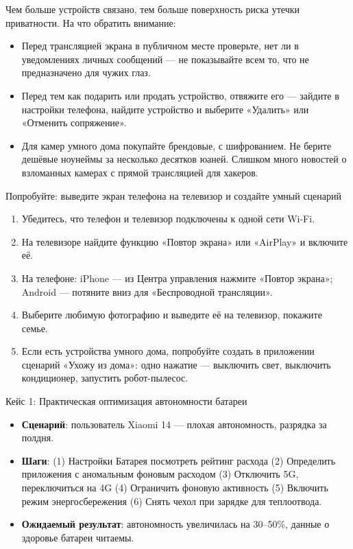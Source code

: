 
Чем больше устройств связано, тем больше поверхность риска утечки приватности. На что обратить внимание:

\begin{itemize}
  \item Перед трансляцией экрана в публичном месте проверьте, нет ли в уведомлениях личных сообщений — не показывайте всем то, что не предназначено для чужих глаз.
  \item Перед тем как подарить или продать устройство, отвяжите его — зайдите в настройки телефона, найдите устройство и выберите «Удалить» или «Отменить сопряжение».
  \item Для камер умного дома покупайте брендовые, с шифрованием. Не берите дешёвые ноунеймы за несколько десятков юаней. Слишком много новостей о взломанных камерах с прямой трансляцией для хакеров.
\end{itemize}

\begin{tcbpractice}{Попробуйте: выведите экран телефона на телевизор и создайте умный сценарий}
\begin{enumerate}
  \item Убедитесь, что телефон и телевизор подключены к одной сети Wi-Fi.
  \item На телевизоре найдите функцию «Повтор экрана» или «AirPlay» и включите её.
  \item На телефоне: iPhone — из Центра управления нажмите «Повтор экрана»; Android — потяните вниз для «Беспроводной трансляции».
  \item Выберите любимую фотографию и выведите её на телевизор, покажите семье.
  \item Если есть устройства умного дома, попробуйте создать в приложении сценарий «Ухожу из дома»: одно нажатие — выключить свет, выключить кондиционер, запустить робот-пылесос.
\end{enumerate}

\end{tcbpractice}

\begin{tcbinfo}{Кейс 1: Практическая оптимизация автономности батареи}
\begin{itemize}
  \item \textbf{Сценарий}: пользователь Xiaomi 14 — плохая автономность, разрядка за полдня.
  \item \textbf{Шаги}: (1) Настройки Батарея посмотреть рейтинг расхода (2) Определить приложения с аномальным фоновым расходом (3) Отключить 5G, переключиться на 4G (4) Ограничить фоновую активность (5) Включить режим энергосбережения (6) Снять чехол при зарядке для теплоотвода.
  \item \textbf{Ожидаемый результат}: автономность увеличилась на 30–50\%, данные о здоровье батареи читаемы.
\end{itemize}

\end{tcbinfo}
